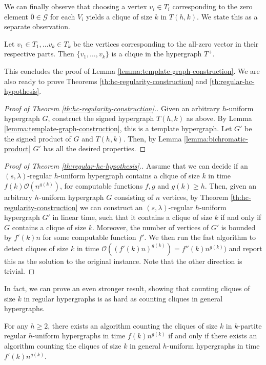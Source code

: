 \documentclass[a4paper,UKenglish,cleveref, autoref, thm-restate,numberwithinsect]{lipics-v2021}
\newcommand{\bigO}{\mathcal{O}}
\newcommand{\G}{\mathcal{G}}
\newcommand{\reg}{\lambda}
\begin{document}
We can finally observe that choosing a vertex $v_i\in T_i$ corresponding to the zero element $\overline{0}\in \G$ for each $V_i$ yields a clique of size $k$ in $T(h,k)$. We state this as a separate observation.
\begin{observation}
    Let $v_1\in T_1,\dots v_k\in T_k$ be the vertices corresponding to the all-zero vector in their respective parts. Then $\{v_1,\dots, v_k\}$ is a clique in the hypergraph $T^+$.
\end{observation}
This concludes the proof of Lemma \ref{lemma:template-graph-construction}.
We are also ready to prove Theorems \ref{th:hc-regularity-construction} and \ref{th:regular-hc-hypothesis}.
\begin{proof}[Proof of Theorem \ref{th:hc-regularity-construction}.]
    Given an arbitrary $h$-uniform hypergraph $G$, construct the signed hypergraph $T(h,k)$ as above. By Lemma \ref{lemma:template-graph-construction}, this is a template hypergraph. 
    Let $G'$ be the signed product of $G$ and $T(h,k)$. 
    Then, by Lemma \ref{lemma:bichromatic-product} $G'$ has all the desired properties.
\end{proof}
\begin{proof}[Proof of Theorem \ref{th:regular-hc-hypothesis}.]
    Assume that we can decide if an $(s,\reg)$-regular $h$-uniform hypergraph contains a clique of size $k$ in time $f(k)\bigO(n^{g(k)})$, for computable functions $f,g$ and $g(k)\geq h$.
    Then, given an arbitrary $h$-uniform hypergraph $G$ consisting of $n$ vertices, by Theorem \ref{th:hc-regularity-construction} we can construct an $(s,\reg)$-regular $h$-uniform hypergraph $G'$ in linear time, such that it contains a clique of size $k$ if and only if $G$ contains a clique of size $k$. Moreover, the number of vertices of $G'$ is bounded by $f'(k)n$ for some computable function $f'$. We then run the fast algorithm to detect cliques of size $k$ in time $\bigO((f'(k)n)^{g(k)}) = f''(k)n^{g(k)})$ and report this as the solution to the original instance.
    Note that the other direction is trivial.
\end{proof}
In fact, we can prove an even stronger result, showing that counting cliques of size $k$ in regular hypergraphs is as hard as counting cliques in general hypergraphs. 
\begin{theorem}\label{thm:counting}
    For any $h\geq 2$, there exists an algorithm counting the cliques of size $k$ in $k$-partite regular $h$-uniform hypergraphs in time $f(k)n^{g(k)}$ if and only if there exists an algorithm counting the cliques of size $k$ in general $h$-uniform hypergraphs in time $f'(k)n^{g(k)}$.
\end{theorem}
\end{document}
